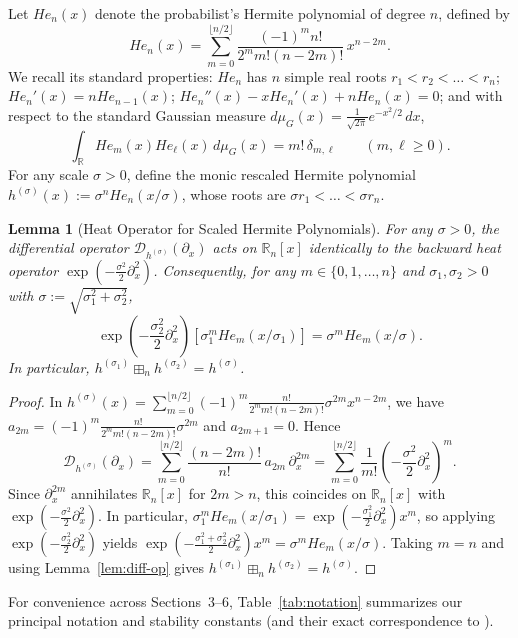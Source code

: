 \documentclass[11pt,a4paper]{article}
\newtheorem{lemma}[theorem]{Lemma}
\theoremstyle{definition}
\newcommand{\R}{\mathbb{R}}
\newcommand{\boxplusn}{\boxplus_n}
\begin{document}
Let $He_n(x)$ denote the probabilist's Hermite polynomial of degree $n$, defined by
\[
He_n(x) = \sum_{m=0}^{\lfloor n/2 \rfloor} \frac{(-1)^m n!}{2^m m! (n-2m)!}\, x^{n-2m}.
\]
We recall its standard properties: $He_n$ has $n$ simple real roots $r_1 < r_2 < \dots < r_n$; $He_n'(x) = n He_{n-1}(x)$; $He_n''(x) - x He_n'(x) + n He_n(x) = 0$; and with respect to the standard Gaussian measure $d\mu_G(x) = \frac{1}{\sqrt{2\pi}} e^{-x^2/2}\,dx$,
\[
\int_{\R} He_m(x) He_\ell(x)\, d\mu_G(x) = m!\,\delta_{m,\ell} \qquad (m, \ell \ge 0).
\]
For any scale $\sigma > 0$, define the monic rescaled Hermite polynomial $h^{(\sigma)}(x) := \sigma^n He_n(x/\sigma)$, whose roots are $\sigma r_1 < \dots < \sigma r_n$.

\begin{lemma}[Heat Operator for Scaled Hermite Polynomials]
\label{lem:heat-op}
For any $\sigma > 0$, the differential operator $\mathcal{D}_{h^{(\sigma)}}(\partial_x)$ acts on $\R_n[x]$ identically to the backward heat operator $\exp\!\left(-\frac{\sigma^2}{2}\partial_x^2\right)$. Consequently, for any $m \in \{0,1,\dots,n\}$ and $\sigma_1,\sigma_2 > 0$ with $\sigma := \sqrt{\sigma_1^2 + \sigma_2^2}$,
\[
\exp\!\left(-\frac{\sigma_2^2}{2}\partial_x^2\right) \left[\sigma_1^m He_m(x/\sigma_1)\right] = \sigma^m He_m(x/\sigma).
\]
In particular, $h^{(\sigma_1)} \boxplusn h^{(\sigma_2)} = h^{(\sigma)}$.
\end{lemma}

\begin{proof}
In $h^{(\sigma)}(x) = \sum_{m=0}^{\lfloor n/2 \rfloor} (-1)^m \frac{n!}{2^m m!(n-2m)!} \sigma^{2m} x^{n-2m}$, we have $a_{2m} = (-1)^m \frac{n!}{2^m m!(n-2m)!} \sigma^{2m}$ and $a_{2m+1} = 0$. Hence
\[
\mathcal{D}_{h^{(\sigma)}}(\partial_x) = \sum_{m=0}^{\lfloor n/2 \rfloor} \frac{(n-2m)!}{n!}\, a_{2m}\, \partial_x^{2m} = \sum_{m=0}^{\lfloor n/2 \rfloor} \frac{1}{m!}\left(-\frac{\sigma^2}{2}\partial_x^2\right)^m.
\]
Since $\partial_x^{2m}$ annihilates $\R_n[x]$ for $2m > n$, this coincides on $\R_n[x]$ with $\exp(-\frac{\sigma^2}{2}\partial_x^2)$. In particular, $\sigma_1^m He_m(x/\sigma_1) = \exp(-\frac{\sigma_1^2}{2}\partial_x^2) x^m$, so applying $\exp(-\frac{\sigma_2^2}{2}\partial_x^2)$ yields $\exp(-\frac{\sigma_1^2+\sigma_2^2}{2}\partial_x^2) x^m = \sigma^m He_m(x/\sigma)$. Taking $m=n$ and using Lemma~\ref{lem:diff-op} gives $h^{(\sigma_1)} \boxplusn h^{(\sigma_2)} = h^{(\sigma)}$.
\end{proof}

For convenience across Sections~3--6, Table~\ref{tab:notation} summarizes our principal notation and stability constants (and their exact correspondence to \cite{HH2026}).
\end{document}
